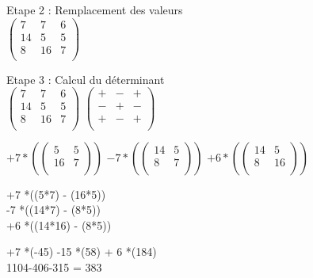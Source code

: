 \vspace{5mm} %

Etape 2 : Remplacement des valeurs \\

\vspace{3mm} %
$
\begin{pmatrix}
  7  & 7  & 6 \\
  14 & 5  & 5 \\
  8  & 16 & 7 \\
\end{pmatrix}
$
\vspace{5mm} %

Etape 3 : Calcul du déterminant \\

\vspace{3mm} %
$
\begin{pmatrix}
  7  & 7  & 6 \\
  14 & 5  & 5 \\
  8  & 16 & 7 \\
\end{pmatrix}
$
$
\begin{pmatrix}
  + & - & + \\
  - & + & - \\
  + & - & + \\
\end{pmatrix}
$

\vspace{5mm} %

$
+7 *(
\begin{pmatrix}
  5 & 5   \\
  16 & 7  \\
\end{pmatrix}
)
$
$
-7 *(
\begin{pmatrix}
  14 & 5  \\
  8 & 7   \\
\end{pmatrix}
)
$
$
+6 *(
\begin{pmatrix}
  14 & 5  \\
  8 & 16  \\
\end{pmatrix}
)
$

\vspace{5mm} %

+7 *((5*7) - (16*5)) \\

-7 *((14*7) - (8*5)) \\

+6 *((14*16) - (8*5)) \\


\vspace{5mm} %

+7 *(-45) -15 *(58) + 6 *(184) \\

1104-406-315 = 383 \\
